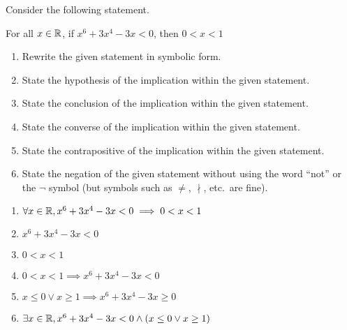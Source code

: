 \begin{recommended}
  Consider the following statement.
  \begin{center}
    For all $x\in\mathbb{R}$, if $x^6 + 3x^4 - 3x < 0$, then $0 < x < 1$
  \end{center}
  \begin{enumerate}
    \item Rewrite the given statement in symbolic form.
    \item State the hypothesis of the implication within the given statement.
    \item State the conclusion of the implication within the given statement.
    \item State the converse of the implication within the given statement.
    \item State the contrapositive of the implication within the given statement.
    \item State the negation of the given statement without using the word ``not''
          or the $\lnot$ symbol (but symbols such as $\neq$, $\nmid$, etc.\ are fine).
  \end{enumerate}
\end{recommended}
\begin{sol}
  \begin{enumerate}
    \item $\forall x\in\mathbb{R}, x^6 + 3x^4 - 3x < 0 \implies 0 < x < 1$
    \item $x^6 + 3x^4 - 3x < 0$
    \item $0 < x < 1$
    \item $0 < x < 1 \implies x^6 + 3x^4 - 3x < 0$
    \item $x \leq 0 \lor x \geq 1 \implies x^6 + 3x^4 - 3x \geq 0$
    \item $\exists x\in\mathbb{R}, x^6 + 3x^4 - 3x < 0 \land (x \leq 0 \lor x \geq 1)$
          \qedhere
  \end{enumerate}
\end{sol}
